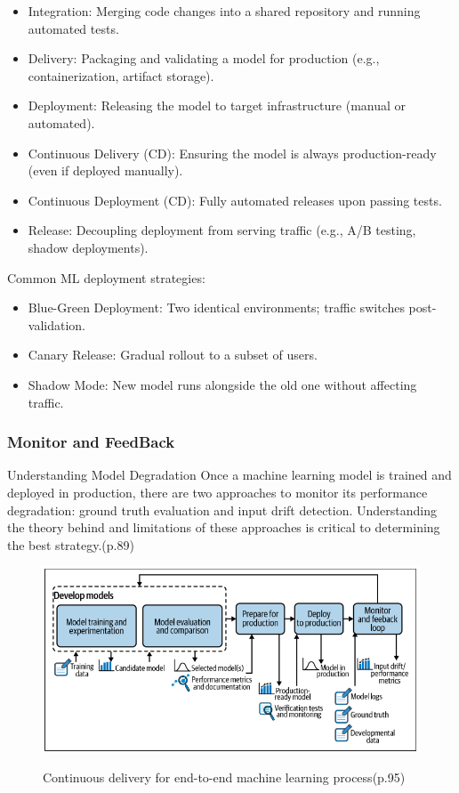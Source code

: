 \begin{itemize}
    \item Integration: Merging code changes into a shared repository and running automated tests.
    \item Delivery: Packaging and validating a model for production (e.g., containerization, artifact storage).
    \item Deployment: Releasing the model to target infrastructure (manual or automated).
    \item Continuous Delivery (CD): Ensuring the model is always production-ready (even if deployed manually).
    \item Continuous Deployment (CD): Fully automated releases upon passing tests.
    \item Release: Decoupling deployment from serving traffic (e.g., A/B testing, shadow deployments).
\end{itemize}
Common ML deployment strategies\cite{gift2021practical}:
\begin{itemize}
    \item Blue-Green Deployment: Two identical environments; traffic switches post-validation.
    \item Canary Release: Gradual rollout to a subset of users.
    \item Shadow Mode: New model runs alongside the old one without affecting traffic.
\end{itemize}


\subsubsection{Monitor and FeedBack}

Understanding Model Degradation
Once a machine learning model is trained and deployed in production, there are two
approaches to monitor its performance degradation: ground truth evaluation and
input drift detection.
Understanding the theory behind and limitations of these
approaches is critical to determining the best strategy.\cite{treveil2020introducing}(p.89)

\begin{figure}[!htbp]
    \caption{Continuous delivery for end-to-end machine learning process\cite{treveil2020introducing}(p.95)}
    \centering
    \includegraphics[scale=0.4]{images/feedback-loop-intro}
    \label{fig:feedback-loop-intro}
\end{figure}


